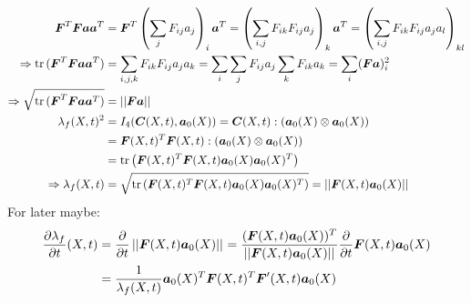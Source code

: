 \begin{align*}
	\vF^T\vF\va\va^T &= \vF^T\left(\sum_j F_{ij}a_j\right)_i\va^T = \left(\sum_{i,j} F_{ik}F_{ij}a_j\right)_k\va^T
		= \left(\sum_{i,j} F_{ik}F_{ij}a_ja_l\right)_{kl}\\
	\Rightarrow \tr{(\vF^T\vF\va\va^T)} &= \sum_{i,j,k} F_{ik}F_{ij}a_ja_k = \sum_i \sum_jF_{ij}a_j \sum_k F_{ik}a_k = \sum_i (\vF\va)_i^2\\
	\Rightarrow \sqrt{\tr{(\vF^T\vF\va\va^T)}} &= \no{\vF\va}\\
	\lambda_f(X,t)^2 &=I_4(\vC(X,t),\va_0(X)) = \vC(X,t):(\va_0(X)\otimes \va_0(X))\\
			&=  \vF(X,t)^T\vF(X,t) : (\va_0(X)\otimes \va_0(X))\\
			&= \tr{\left(\vF(X,t)^T\vF(X,t)\va_0(X)\va_0(X)^T\right)}\\
	\Rightarrow \lambda_f(X,t) &=
			\sqrt{\tr{\left(\vF(X,t)^T\vF(X,t)\va_0(X)\va_0(X)^T\right)}} = \no{\vF(X,t)\va_0(X)} 
\end{align*}
For later maybe:
\begin{align*}
	\d{\lambda_f}{t}(X,t) &= \d{}{t}\no{\vF(X,t)\va_0(X)} = \frac{(\vF(X,t)\va_0(X))^T}{\no{\vF(X,t)\va_0(X)}}\d{}{t}\vF(X,t)\va_0(X)\\
	  &= \frac{1}{\lambda_f(X,t)}\va_0(X)^T\vF(X,t)^T\vF'(X,t)\va_0(X)
\end{align*}

